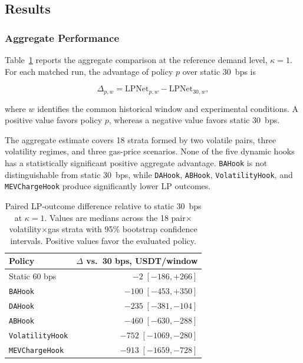 \documentclass[a4paper,conference]{IEEEtran}
\begin{document}
\subsection{Results}

\subsubsection{Aggregate Performance}

Table~\ref{tab:headline} reports the aggregate comparison at the
reference demand level, $\kappa=1$. For each matched run, the
advantage of policy $p$ over static 30~bps is

\begin{equation}
  \Delta_{p,w}
  =
  \mathrm{LPNet}_{p,w}
  -
  \mathrm{LPNet}_{30,w},
  \label{eq:paired-advantage}
\end{equation}

where $w$ identifies the common historical window and experimental
conditions. A positive value favors policy $p$, whereas a negative
value favors static 30~bps.

The aggregate estimate covers 18 strata formed by two volatile pairs,
three volatility regimes, and three gas-price scenarios. None of the
five dynamic hooks has a statistically significant positive aggregate
advantage. \texttt{BAHook} is not distinguishable from static 30~bps,
while \texttt{DAHook}, \texttt{ABHook},
\texttt{VolatilityHook}, and \texttt{MEVChargeHook} produce
significantly lower LP outcomes.

\begin{table}[!t]
  \caption{Paired LP-outcome difference relative to static 30~bps at
    $\kappa=1$. Values are medians across the 18
    pair$\times$volatility$\times$gas strata with 95\% bootstrap
  confidence intervals. Positive values favor the evaluated policy.}
  \label{tab:headline}
  \centering
  \footnotesize
  \begin{tabular}{lr}
    \toprule
    \textbf{Policy} &
    \textbf{$\Delta$ vs.\ 30 bps, USDT/window}\\
    \midrule
    Static 60 bps                  & $-2\;[-186,+266]$\\
    \texttt{BAHook}                & $-100\;[-453,+350]$\\
    \texttt{DAHook}                & $-235\;[-381,-104]$\\
    \texttt{ABHook}                & $-460\;[-630,-288]$\\
    \texttt{VolatilityHook}        & $-752\;[-1069,-280]$\\
    \texttt{MEVChargeHook}         & $-913\;[-1659,-728]$\\
    \bottomrule
  \end{tabular}
\end{table}
\end{document}
